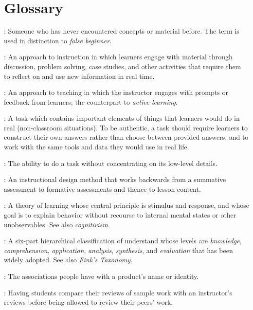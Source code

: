 \chapter{Glossary}\label{s:gloss}

\begin{description}

: Someone who has never
encountered concepts or material before. The term is used in distinction to
\emph{false beginner}.

: An approach to instruction in which
learners engage with material through discussion, problem solving, case studies,
and other activities that require them to reflect on and use new information in
real time.

: An approach to teaching in which the
instructor engages with prompts or feedback from learners; the counterpart to
\emph{active learning}.

: A task which contains important
elements of things that learners would do in real (non-classroom situations). To
be authentic, a task should require learners to construct their own answers
rather than choose between provided answers, and to work with the same tools and
data they would use in real life.

: The ability to do a task without
concentrating on its low-level details.

: An instructional design method that
works backwards from a summative assessment to formative assessments and thence
to lesson content.

: A theory of learning whose central principle
is stimulus and response, and whose goal is to explain behavior without recourse
to internal mental states or other unobservables. See also \emph{cognitivism}.

: A six-part hierarchical
classification of understand whose levels are \emph{knowledge},
\emph{comprehension}, \emph{application}, \emph{analysis}, \emph{synthesis}, and
\emph{evaluation} that has been widely adopted. See also \emph{Fink's Taxonomy}.

: The associations people have with a product's name or
identity.

: Having students
compare their reviews of sample work with an instructor's reviews before being
allowed to review their peers' work.


\end{description}
